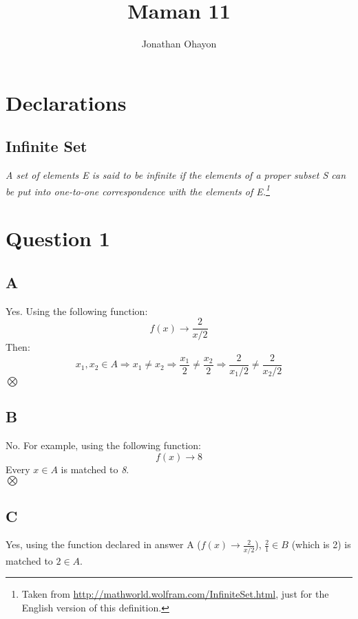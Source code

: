 \documentclass[12pt, oneside]{article}
\title{Maman 11}
\author{Jonathan Ohayon}
\begin{document}
\maketitle
\setcounter{section}{-1}

\section{Declarations}
\subsection{Infinite Set}
\begin{center}
\emph{A set of elements E is said to be infinite if the elements of a proper subset S can be put into one-to-one correspondence with the elements of E.\footnote{Taken from \url{http://mathworld.wolfram.com/InfiniteSet.html}, just for the English version of this definition.}}
\end{center}

\section{Question 1}
\subsection{A}
Yes. Using the following function:
\begin{equation*}
f(x) \rightarrow \frac{2}{x/2}
\end{equation*}
Then:
\begin{equation*}
x_1, x_2 \in A \Rightarrow
x_1 \neq x_2 \Rightarrow
\frac{x_1}{2} \neq \frac{x_2}{2} \Rightarrow
\frac{2}{x_1/2} \neq \frac{2}{x_2/2}
\end{equation*}
$\bigotimes$

\subsection{B}
No. For example, using the following function:
\begin{equation*}
f(x) \rightarrow 8
\end{equation*}
Every $x \in A$ is matched to \emph{8}.\\
$\bigotimes$

\subsection{C}
Yes, using the function declared in answer A ($f(x) \rightarrow \frac{2}{x/2}$), $\frac{2}{1} \in B$ (which is 2) is matched to $2 \in A$.
\end{document}
